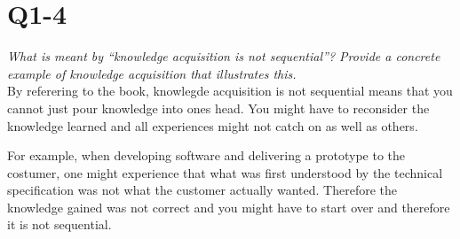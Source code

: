 \section{Q1-4}
\emph{What is meant by “knowledge acquisition is not sequential”? Provide a concrete example of knowledge acquisition that illustrates this.}\\

By referering to the book, knowlegde acquisition is not sequential means that you cannot just pour knowledge into ones head. You might have to reconsider the knowledge learned and all experiences might not catch on as well as others.

For example, when developing software and delivering a prototype to the costumer, one might experience that what was first understood by the technical specification was not what the customer actually wanted. Therefore the knowledge gained was not correct and you might have to start over and therefore it is not sequential.